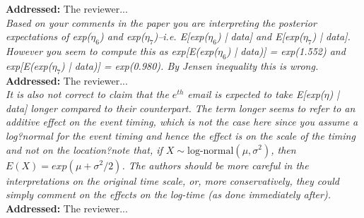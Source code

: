 \documentclass[12pt]{article}
\newcommand{\grey}[1]{{\color{mygrey}#1}}
\theoremstyle{definition}
\begin{document}
\noindent \textcolor{MyGreen}{\textbf{Addressed:}} The reviewer... \\



 \grey{\emph{Based on your comments in the paper you are interpreting the posterior expectations of exp($\eta_6$) and exp($\eta_7$)--i.e. E[exp($\eta_6$) | data] and E[exp($\eta_7$) | data]. However you seem to compute this as exp[E(exp($\eta_6$) | data)] = exp(1.552) and exp[E(exp($\eta_7$) | data)] = exp(0.980). By Jensen inequality this is wrong.}}\\

\noindent \textcolor{MyGreen}{\textbf{Addressed:}} The reviewer... \\

 \grey{\emph{It is also not correct to claim that the $e^{th}$ email is expected to take E[exp($\eta$) | data] longer compared to their counterpart. The term longer seems to refer to an additive effect on the event timing, which is not the case here since you assume a log?normal for the event timing and hence the effect is on the scale of the timing and not on the location?note that, if $X \sim \text{log-normal}(\mu, \sigma^2)$, then $E(X) = exp(\mu + \sigma^2/2)$. The authors should be more careful in the interpretations on the original time scale, or, more conservatively, they could simply comment on the effects on the log-time (as done immediately after).}}\\

\noindent \textcolor{MyGreen}{\textbf{Addressed:}} The reviewer... \\
\end{document}
